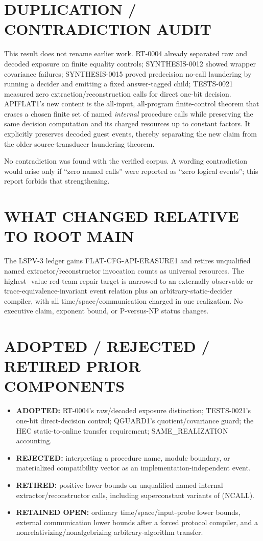 \documentclass[11pt]{article}
\begin{document}
\section{DUPLICATION / CONTRADICTION AUDIT}
This result does not rename earlier work.  RT-0004 already separated raw and
decoded exposure on finite equality controls; SYNTHESIS-0012 showed wrapper
covariance failures; SYNTHESIS-0015 proved predecision no-call laundering by
running a decider and emitting a fixed answer-tagged child; TESTS-0021 measured
zero extraction/reconstruction calls for direct one-bit decision.  APIFLAT1's
new content is the all-input, all-program finite-control theorem that erases a
chosen finite set of named \emph{internal} procedure calls while preserving the
same decision computation and its charged resources up to constant factors.
It explicitly preserves decoded guest events, thereby separating the new claim
from the older source-transducer laundering theorem.

No contradiction was found with the verified corpus.  A wording contradiction
would arise only if ``zero named calls'' were reported as ``zero logical
events''; this report forbids that strengthening.

\section{WHAT CHANGED RELATIVE TO ROOT MAIN}
The LSPV-3 ledger gains FLAT-CFG-API-ERASURE1 and retires unqualified named
extractor/reconstructor invocation counts as universal resources.  The highest-
value red-team repair target is narrowed to an externally observable or
trace-equivalence-invariant event relation plus an arbitrary-static-decider
compiler, with all time/space/communication charged in one realization.
No executive claim, exponent bound, or P-versus-NP status changes.

\section{ADOPTED / REJECTED / RETIRED PRIOR COMPONENTS}
\begin{itemize}[leftmargin=1.5em]
\item \textbf{ADOPTED:} RT-0004's raw/decoded exposure distinction; TESTS-0021's
one-bit direct-decision control; QGUARD1's quotient/covariance guard; the HEC
static-to-online transfer requirement; SAME\_REALIZATION accounting.
\item \textbf{REJECTED:} interpreting a procedure name, module boundary, or
materialized compatibility vector as an implementation-independent event.
\item \textbf{RETIRED:} positive lower bounds on unqualified named internal
extractor/reconstructor calls, including superconstant variants of (NCALL).
\item \textbf{RETAINED OPEN:} ordinary time/space/input-probe lower bounds,
external communication lower bounds after a forced protocol compiler, and a
nonrelativizing/nonalgebrizing arbitrary-algorithm transfer.
\end{itemize}
\end{document}
